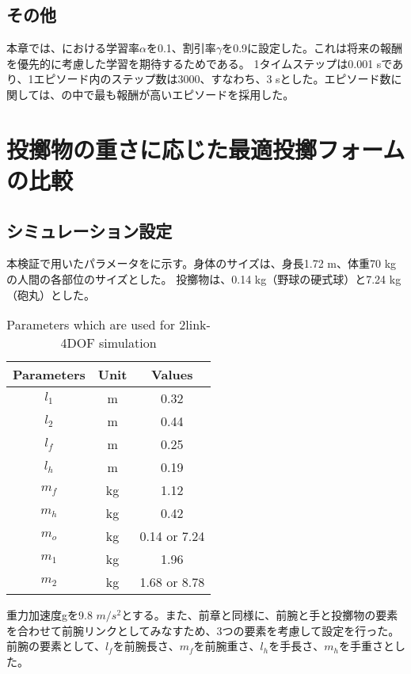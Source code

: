 \subsection{その他}
本章では、における学習率$\alpha$を0.1、割引率$\gamma$を0.9に設定した。これは将来の報酬を優先的に考慮した学習を期待するためである。
1タイムステップは0.001 sであり、1エピソード内のステップ数は3000、すなわち、3 sとした。エピソード数に関しては、の中で最も報酬が高いエピソードを採用した。

\section{投擲物の重さに応じた最適投擲フォームの比較}
\subsection{シミュレーション設定}
本検証で用いたパラメータをに示す。身体のサイズは、身長1.72 m、体重70 kgの人間の各部位のサイズとした。
投擲物は、0.14 kg（野球の硬式球）と7.24 kg（砲丸）とした。
\begin{table}[tb]
  \begin{center}
    \caption{Parameters which are used for 2link-4DOF simulation}

    \begin{tabular}{c|c|c}
      \hline
      Parameters & Unit & Values \\
      \hline
      $l_{1}$ & m & 0.32 \\
      $l_{2}$ & m & 0.44 \\
      $l_{f}$ & m & 0.25 \\
      $l_{h}$ & m & 0.19 \\
      $m_{f}$ & kg & 1.12 \\
      $m_{h}$ & kg & 0.42 \\
      $m_{o}$ & kg & 0.14 or 7.24 \\
      $m_{1}$ & kg & 1.96 \\
      $m_{2}$ & kg & 1.68 or 8.78 \\
      \hline
    \end{tabular}
  \end{center}
\end{table}
重力加速度gを9.8 $m/s^{2}$とする。また、前章と同様に、前腕と手と投擲物の要素を合わせて前腕リンクとしてみなすため、3つの要素を考慮して設定を行った。
前腕の要素として、$l_{f}$を前腕長さ、$m_{f}$を前腕重さ、$l_{h}$を手長さ、$m_{h}$を手重さとした。\\

